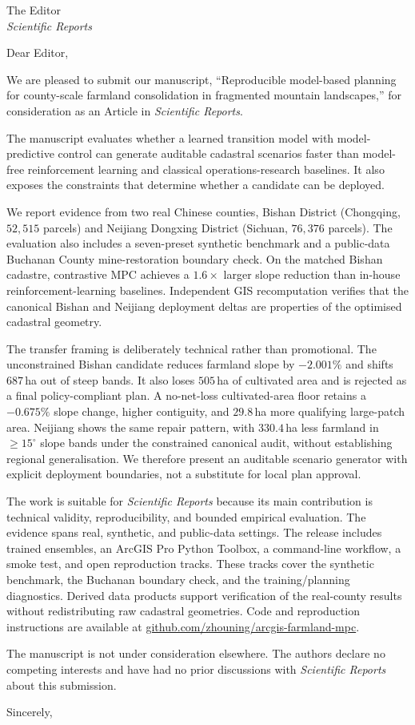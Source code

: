 ﻿\documentclass[11pt]{letter}
\begin{document}
\begin{letter}{The Editor \\ \textit{Scientific Reports}}

\opening{Dear Editor,}

We are pleased to submit our manuscript, ``Reproducible model-based planning for county-scale farmland consolidation in fragmented mountain landscapes,'' for consideration as an Article in \textit{Scientific Reports}.

The manuscript evaluates whether a learned transition model with model-predictive control can generate auditable cadastral scenarios faster than model-free reinforcement learning and classical operations-research baselines. It also exposes the constraints that determine whether a candidate can be deployed.

We report evidence from two real Chinese counties, Bishan District (Chongqing, $52{,}515$ parcels) and Neijiang Dongxing District (Sichuan, $76{,}376$ parcels). The evaluation also includes a seven-preset synthetic benchmark and a public-data Buchanan County mine-restoration boundary check. On the matched Bishan cadastre, contrastive MPC achieves a $1.6\times$ larger slope reduction than in-house reinforcement-learning baselines. Independent GIS recomputation verifies that the canonical Bishan and Neijiang deployment deltas are properties of the optimised cadastral geometry.

The transfer framing is deliberately technical rather than promotional. The unconstrained Bishan candidate reduces farmland slope by $-2.001\%$ and shifts $687$\,ha out of steep bands. It also loses $505$\,ha of cultivated area and is rejected as a final policy-compliant plan. A no-net-loss cultivated-area floor retains a $-0.675\%$ slope change, higher contiguity, and $29.8$\,ha more qualifying large-patch area. Neijiang shows the same repair pattern, with $330.4$\,ha less farmland in $\geq 15^\circ$ slope bands under the constrained canonical audit, without establishing regional generalisation. We therefore present an auditable scenario generator with explicit deployment boundaries, not a substitute for local plan approval.

The work is suitable for \textit{Scientific Reports} because its main contribution is technical validity, reproducibility, and bounded empirical evaluation. The evidence spans real, synthetic, and public-data settings. The release includes trained ensembles, an ArcGIS Pro Python Toolbox, a command-line workflow, a smoke test, and open reproduction tracks. These tracks cover the synthetic benchmark, the Buchanan boundary check, and the training/planning diagnostics. Derived data products support verification of the real-county results without redistributing raw cadastral geometries. Code and reproduction instructions are available at \href{https://github.com/zhouning/arcgis-farmland-mpc}{github.com/zhouning/arcgis-farmland-mpc}.

The manuscript is not under consideration elsewhere. The authors declare no competing interests and have had no prior discussions with \textit{Scientific Reports} about this submission.

\closing{Sincerely,}

\end{letter}
\end{document}
